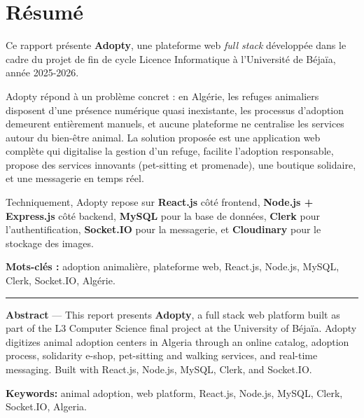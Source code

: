 \documentclass[12pt,a4paper]{report}
\begin{document}
\chapter*{Résumé}
\thispagestyle{plain}

Ce rapport présente \textbf{Adopty}, une plateforme web \textit{full stack} développée dans le cadre du projet de fin de cycle Licence Informatique à l'Université de Béjaïa, année 2025-2026.

Adopty répond à un problème concret : en Algérie, les refuges animaliers disposent d'une présence numérique quasi inexistante, les processus d'adoption demeurent entièrement manuels, et aucune plateforme ne centralise les services autour du bien-être animal. La solution proposée est une application web complète qui digitalise la gestion d'un refuge, facilite l'adoption responsable, propose des services innovants (pet-sitting et promenade), une boutique solidaire, et une messagerie en temps réel.

Techniquement, Adopty repose sur \textbf{React.js} côté frontend, \textbf{Node.js + Express.js} côté backend, \textbf{MySQL} pour la base de données, \textbf{Clerk} pour l'authentification, \textbf{Socket.IO} pour la messagerie, et \textbf{Cloudinary} pour le stockage des images.

\vspace{0.5em}
\textbf{Mots-clés :} adoption animalière, plateforme web, React.js, Node.js, MySQL, Clerk, Socket.IO, Algérie.

\vspace{1em}
\noindent\rule{\linewidth}{0.4pt}
\vspace{0.5em}

\noindent\textbf{Abstract} --- This report presents \textbf{Adopty}, a full stack web platform built as part of the L3 Computer Science final project at the University of Béjaïa. Adopty digitizes animal adoption centers in Algeria through an online catalog, adoption process, solidarity e-shop, pet-sitting and walking services, and real-time messaging. Built with React.js, Node.js, MySQL, Clerk, and Socket.IO.

\textbf{Keywords:} animal adoption, web platform, React.js, Node.js, MySQL, Clerk, Socket.IO, Algeria.

\tableofcontents\newpage
\listoffigures\newpage
\listoftables\newpage
\end{document}
